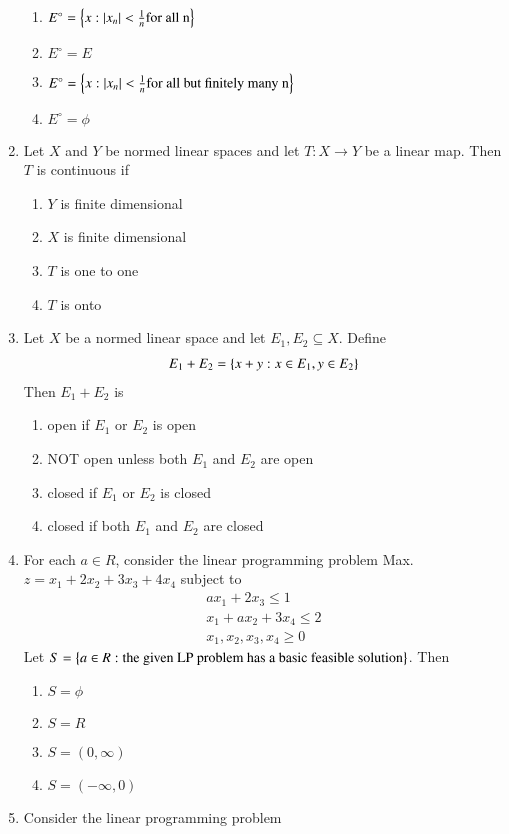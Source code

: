 \documentclass[journal]{IEEEtran}
\begin{document}
\begin{enumerate}
                \begin{enumerate}
			\item $E^{\circ}=\left\{x:\left\vert x_{n}\right\vert<\frac{1}{n} \text{for all n}\right\}$
			\item $E^{\circ}=E$
			\item $E^{\circ}=\left\{x:\left\vert x_{n}\right\vert<\frac{1}{n} \text{for all but finitely many n}\right\}$
			\item $E^{\circ}=\phi$
        	\end{enumerate}		
	\item Let $X$ and $Y$ be normed linear spaces and let $T: X \rightarrow Y$ be a linear map. Then $T$ is continuous if
		\begin{enumerate}
			\item $Y$ is finite dimensional
			\item $X$ is finite dimensional
			\item $T$ is one to one
			\item $T$ is onto
        	\end{enumerate}	
	\item Let $X$ be a normed linear space and let $E_{1}, E_{2} \subseteq X$. Define
           \begin{align*}
		E_{1}+E_{2}=\left\{x+y: x \in E_{1}, y \in E_{2}\right\} 
             \end{align*}
             Then $E_{1}+E_{2}$ is
		\begin{enumerate}
			\item open if $E_{1}$ or $E_{2}$ is open
			\item NOT open unless both $E_{1}$ and $E_{2}$ are open
			\item closed if $E_{1}$ or $E_{2}$ is closed
			\item closed if both $E_{1}$ and $E_{2}$ are closed
        	\end{enumerate}	
	\item For each $a \in R$, consider the linear programming problem Max. $z=x_{1}+2 x_{2}+3 x_{3}+4 x_{4}$
subject to 
           \begin{align*}	
 a x_{1}+2 x_{3} \leq 1 \\
 x_{1}+a x_{2}+3 x_{4} \leq 2 \\
 x_{1}, x_{2}, x_{3}, x_{4} \geq 0
             \end{align*} 
	     Let $S=\left\{a \in R : \text{the given LP problem has a basic feasible solution} \right\}$. Then
		\begin{enumerate}
			\item $S=\phi$
			\item $S=R$
			\item $S=(0, \infty)$
			\item $S=(-\infty, 0)$
        	\end{enumerate}	
	\item Consider the linear programming problem


\end{enumerate}
\end{document}
